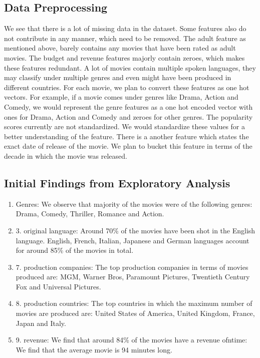 \documentclass{article}
\begin{document}
\subsection{Data Preprocessing}
We see that there is a lot of missing data in the dataset. Some features also do not contribute in any manner, which need to be removed. The adult feature as mentioned above, barely contains any movies that have been rated as adult movies.
The budget and revenue features majorly contain zeroes, which makes these features redundant. A lot of movies contain multiple spoken languages, they may classify under multiple genres and even might have been produced in different countries. For each movie, we plan to convert these features as one hot vectors. For example, if a movie comes under genres like Drama, Action and Comedy, we would represent the genre features as a one hot encoded vector with ones for Drama, Action and Comedy and zeroes for other genres. The popularity scores currently are not standardized. We would standardize these values for a better understanding of the feature. There is a another feature which states the exact date of release of the movie. We plan to bucket this feature in terms of the decade in which the movie was released.

\subsection{Initial Findings from Exploratory Analysis}

\begin{enumerate}
    \item Genres: We observe that majority of the movies were of the following genres: Drama, Comedy, Thriller, Romance and Action.
\item 3. original language: Around 70\% of the movies have been shot in the English language. English, French, Italian, Japanese and German languages account for around 85\% of the movies in total.
\item 7. production companies: The top production companies in terms of movies produced are: MGM, Warner Bros, Paramount Pictures, Twentieth Century Fox and Universal Pictures.
\item 8. production countries: The top countries in which the maximum number of movies are produced are: United States of America, United Kingdom, France, Japan and Italy.
\item 9. revenue: We find that around 84\% of the movies have a revenue ofntime: We find that the average movie is 94 minutes long.
\end{enumerate}
\end{document}
